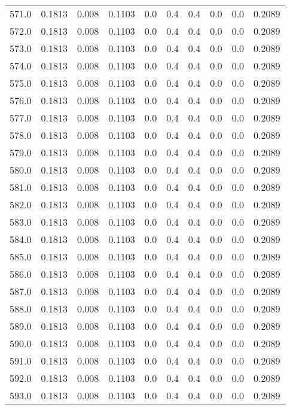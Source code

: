 \begin{longtable}{lrrrrrrrrr}
571.0 & 0.1813 & 0.008 & 0.1103 & 0.0 & 0.4 & 0.4 & 0.0 & 0.0 & 0.2089 \\
572.0 & 0.1813 & 0.008 & 0.1103 & 0.0 & 0.4 & 0.4 & 0.0 & 0.0 & 0.2089 \\
573.0 & 0.1813 & 0.008 & 0.1103 & 0.0 & 0.4 & 0.4 & 0.0 & 0.0 & 0.2089 \\
574.0 & 0.1813 & 0.008 & 0.1103 & 0.0 & 0.4 & 0.4 & 0.0 & 0.0 & 0.2089 \\
575.0 & 0.1813 & 0.008 & 0.1103 & 0.0 & 0.4 & 0.4 & 0.0 & 0.0 & 0.2089 \\
576.0 & 0.1813 & 0.008 & 0.1103 & 0.0 & 0.4 & 0.4 & 0.0 & 0.0 & 0.2089 \\
577.0 & 0.1813 & 0.008 & 0.1103 & 0.0 & 0.4 & 0.4 & 0.0 & 0.0 & 0.2089 \\
578.0 & 0.1813 & 0.008 & 0.1103 & 0.0 & 0.4 & 0.4 & 0.0 & 0.0 & 0.2089 \\
579.0 & 0.1813 & 0.008 & 0.1103 & 0.0 & 0.4 & 0.4 & 0.0 & 0.0 & 0.2089 \\
580.0 & 0.1813 & 0.008 & 0.1103 & 0.0 & 0.4 & 0.4 & 0.0 & 0.0 & 0.2089 \\
581.0 & 0.1813 & 0.008 & 0.1103 & 0.0 & 0.4 & 0.4 & 0.0 & 0.0 & 0.2089 \\
582.0 & 0.1813 & 0.008 & 0.1103 & 0.0 & 0.4 & 0.4 & 0.0 & 0.0 & 0.2089 \\
583.0 & 0.1813 & 0.008 & 0.1103 & 0.0 & 0.4 & 0.4 & 0.0 & 0.0 & 0.2089 \\
584.0 & 0.1813 & 0.008 & 0.1103 & 0.0 & 0.4 & 0.4 & 0.0 & 0.0 & 0.2089 \\
585.0 & 0.1813 & 0.008 & 0.1103 & 0.0 & 0.4 & 0.4 & 0.0 & 0.0 & 0.2089 \\
586.0 & 0.1813 & 0.008 & 0.1103 & 0.0 & 0.4 & 0.4 & 0.0 & 0.0 & 0.2089 \\
587.0 & 0.1813 & 0.008 & 0.1103 & 0.0 & 0.4 & 0.4 & 0.0 & 0.0 & 0.2089 \\
588.0 & 0.1813 & 0.008 & 0.1103 & 0.0 & 0.4 & 0.4 & 0.0 & 0.0 & 0.2089 \\
589.0 & 0.1813 & 0.008 & 0.1103 & 0.0 & 0.4 & 0.4 & 0.0 & 0.0 & 0.2089 \\
590.0 & 0.1813 & 0.008 & 0.1103 & 0.0 & 0.4 & 0.4 & 0.0 & 0.0 & 0.2089 \\
591.0 & 0.1813 & 0.008 & 0.1103 & 0.0 & 0.4 & 0.4 & 0.0 & 0.0 & 0.2089 \\
592.0 & 0.1813 & 0.008 & 0.1103 & 0.0 & 0.4 & 0.4 & 0.0 & 0.0 & 0.2089 \\
593.0 & 0.1813 & 0.008 & 0.1103 & 0.0 & 0.4 & 0.4 & 0.0 & 0.0 & 0.2089 \\

\end{longtable}
